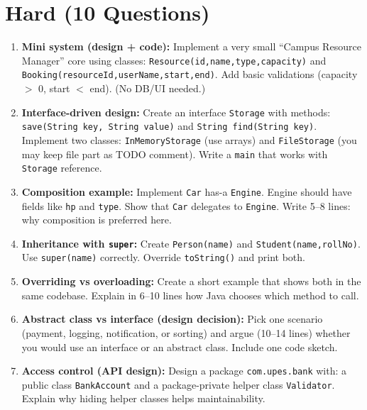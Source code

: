 \documentclass[11pt,a4paper]{article}
\begin{document}
\section*{Hard (10 Questions)}
\begin{enumerate}[label=H\arabic*., leftmargin=*]
  \item \textbf{Mini system (design + code):} Implement a very small ``Campus Resource Manager'' core using classes:
    \texttt{Resource(id,name,type,capacity)} and \texttt{Booking(resourceId,userName,start,end)}.
    Add basic validations (capacity $>$ 0, start $<$ end). (No DB/UI needed.)

  \item \textbf{Interface-driven design:} Create an interface \texttt{Storage} with methods:
    \texttt{save(String key, String value)} and \texttt{String find(String key)}.
    Implement two classes:
    \texttt{InMemoryStorage} (use arrays) and \texttt{FileStorage} (you may keep file part as TODO comment).
    Write a \texttt{main} that works with \texttt{Storage} reference.

  \item \textbf{Composition example:} Implement \texttt{Car} has-a \texttt{Engine}.
    Engine should have fields like \texttt{hp} and \texttt{type}. Show that \texttt{Car} delegates to \texttt{Engine}.
    Write 5--8 lines: why composition is preferred here.

  \item \textbf{Inheritance with \texttt{super}:} Create \texttt{Person(name)} and \texttt{Student(name,rollNo)}.
    Use \texttt{super(name)} correctly. Override \texttt{toString()} and print both.

  \item \textbf{Overriding vs overloading:} Create a short example that shows both in the same codebase.
    Explain in 6--10 lines how Java chooses which method to call.

  \item \textbf{Abstract class vs interface (design decision):} Pick one scenario (payment, logging, notification, or sorting)
    and argue (10--14 lines) whether you would use an interface or an abstract class. Include one code sketch.

  \item \textbf{Access control (API design):} Design a package \texttt{com.upes.bank} with:
    a public class \texttt{BankAccount} and a package-private helper class \texttt{Validator}.
    Explain why hiding helper classes helps maintainability.


\end{enumerate}
\end{document}
